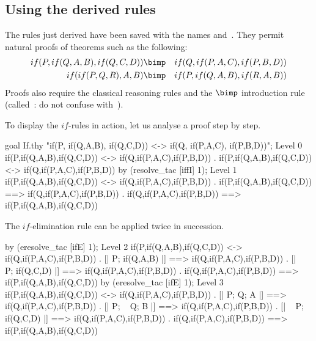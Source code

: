 \subsection{Using the derived rules}
The rules just derived have been saved with the {\ML} names 
and~.  They permit natural proofs of theorems such as the
following:
\begin{eqnarray*}
    if(P, if(Q,A,B), if(Q,C,D))	& \bimp & if(Q,if(P,A,C),if(P,B,D)) \\
    if(if(P,Q,R), A, B)		& \bimp & if(P,if(Q,A,B),if(R,A,B))
\end{eqnarray*}
Proofs also require the classical reasoning rules and the $\bimp$
introduction rule (called~: do not confuse with~). 

To display the $if$-rules in action, let us analyse a proof step by step.
\begin{ttbox}
goal If.thy
    "if(P, if(Q,A,B), if(Q,C,D)) <-> if(Q, if(P,A,C), if(P,B,D))";
{\out Level 0}
{\out if(P,if(Q,A,B),if(Q,C,D)) <-> if(Q,if(P,A,C),if(P,B,D))}
{. if(P,if(Q,A,B),if(Q,C,D)) <-> if(Q,if(P,A,C),if(P,B,D))}
\ttbreak
by (resolve_tac [iffI] 1);
{\out Level 1}
{\out if(P,if(Q,A,B),if(Q,C,D)) <-> if(Q,if(P,A,C),if(P,B,D))}
{. if(P,if(Q,A,B),if(Q,C,D)) ==> if(Q,if(P,A,C),if(P,B,D))}
{. if(Q,if(P,A,C),if(P,B,D)) ==> if(P,if(Q,A,B),if(Q,C,D))}
\end{ttbox}
The $if$-elimination rule can be applied twice in succession.
\begin{ttbox}
by (eresolve_tac [ifE] 1);
{\out Level 2}
{\out if(P,if(Q,A,B),if(Q,C,D)) <-> if(Q,if(P,A,C),if(P,B,D))}
{. [| P; if(Q,A,B) |] ==> if(Q,if(P,A,C),if(P,B,D))}
{. [| ~ P; if(Q,C,D) |] ==> if(Q,if(P,A,C),if(P,B,D))}
{. if(Q,if(P,A,C),if(P,B,D)) ==> if(P,if(Q,A,B),if(Q,C,D))}
\ttbreak
by (eresolve_tac [ifE] 1);
{\out Level 3}
{\out if(P,if(Q,A,B),if(Q,C,D)) <-> if(Q,if(P,A,C),if(P,B,D))}
{. [| P; Q; A |] ==> if(Q,if(P,A,C),if(P,B,D))}
{. [| P; ~ Q; B |] ==> if(Q,if(P,A,C),if(P,B,D))}
{. [| ~ P; if(Q,C,D) |] ==> if(Q,if(P,A,C),if(P,B,D))}
{. if(Q,if(P,A,C),if(P,B,D)) ==> if(P,if(Q,A,B),if(Q,C,D))}
\end{ttbox}

